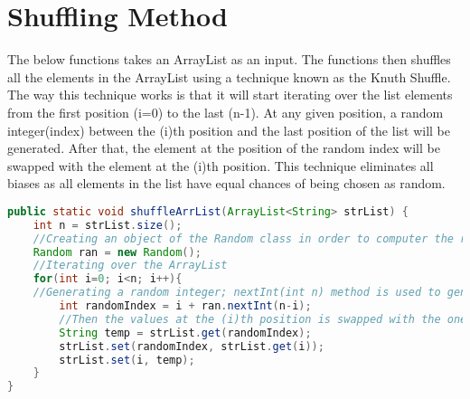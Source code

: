 \documentclass{article}
\begin{document}
\section{Shuffling Method}
The below functions takes an ArrayList as an input. The functions then shuffles all the elements in the ArrayList using a technique known as the Knuth Shuffle. The way this technique works is that it will start iterating over the list elements from the first position (i=0) to the last (n-1). At any given position, a random integer(index) between the (i)th position and the last position of the list will be generated. After that, the element at the position of the random index will be swapped with the element at the (i)th position. This technique eliminates all biases as all elements in the list have equal chances of being chosen as random.
\begin{lstlisting}[language=Java]
public static void shuffleArrList(ArrayList<String> strList) {
    int n = strList.size();
    //Creating an object of the Random class in order to computer the random integer 
    Random ran = new Random();
    //Iterating over the ArrayList
    for(int i=0; i<n; i++){ 
    //Generating a random integer; nextInt(int n) method is used to generate a random integer from the sequence of 0(inclusive) to the number passed as an argument.
        int randomIndex = i + ran.nextInt(n-i);
        //Then the values at the (i)th position is swapped with the one at the randomIndex.
        String temp = strList.get(randomIndex);
        strList.set(randomIndex, strList.get(i));
        strList.set(i, temp);
    }
}
\end{lstlisting}
\end{document}
